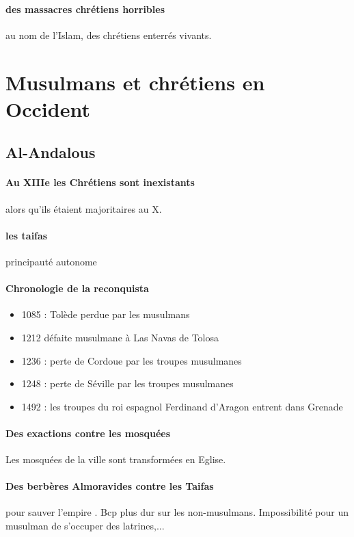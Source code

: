\paragraph{des massacres chrétiens horribles} au nom de l'Islam, des chrétiens enterrés vivants.

\section{Musulmans et chrétiens en Occident}


\subsection{Al-Andalous}
\paragraph{Au XIIIe les Chrétiens sont inexistants} alors qu'ils étaient majoritaires au X. 

\paragraph{les taifas} principauté autonome

\paragraph{Chronologie de la reconquista}

\begin{itemize}
 
    \item 1085 : Tolède perdue par les musulmans
    \item 1212
défaite musulmane à Las Navas de Tolosa
    \item 1236 : perte de Cordoue par les troupes musulmanes
    \item 1248 : perte de Séville par les troupes musulmanes
    \item 1492 : les troupes du roi espagnol Ferdinand d’Aragon entrent dans Grenade
\end{itemize}

\paragraph{Des exactions contre les mosquées} Les mosquées de la ville sont transformées en Eglise. 

\paragraph{Des berbères Almoravides contre les Taifas} pour sauver l'empire . Bcp plus dur sur les non-musulmans.  Impossibilité pour un musulman de s'occuper des latrines,...

